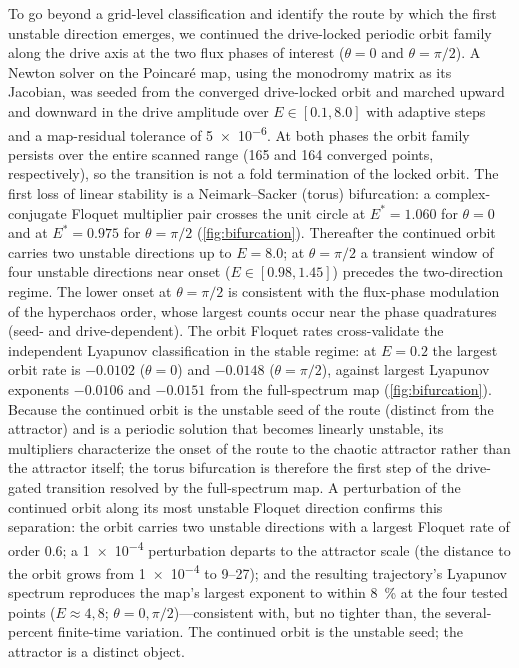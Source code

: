 \documentclass[preprint,numbers,a4paper]{elsarticle}
\begin{document}
To go beyond a grid-level classification and identify the route by which the first unstable direction emerges, we continued the drive-locked periodic orbit family along the drive axis at the two flux phases of interest ($\theta=0$ and $\theta=\pi/2$). A Newton solver on the Poincar\'e map, using the monodromy matrix as its Jacobian, was seeded from the converged drive-locked orbit and marched upward and downward in the drive amplitude over $E\in[\num{0.1},\num{8.0}]$ with adaptive steps and a map-residual tolerance of \num{5e-6}. At both phases the orbit family persists over the entire scanned range (\num{165} and \num{164} converged points, respectively), so the transition is not a fold termination of the locked orbit. The first loss of linear stability is a Neimark--Sacker (torus) bifurcation: a complex-conjugate Floquet multiplier pair crosses the unit circle at $E^{*}=\num{1.060}$ for $\theta=0$ and at $E^{*}=\num{0.975}$ for $\theta=\pi/2$ (\cref{fig:bifurcation}). Thereafter the continued orbit carries two unstable directions up to $E=\num{8.0}$; at $\theta=\pi/2$ a transient window of four unstable directions near onset ($E\in[\num{0.98},\num{1.45}]$) precedes the two-direction regime. The lower onset at $\theta=\pi/2$ is consistent with the flux-phase modulation of the hyperchaos order, whose largest counts occur near the phase quadratures (seed- and drive-dependent). The orbit Floquet rates cross-validate the independent Lyapunov classification in the stable regime: at $E=\num{0.2}$ the largest orbit rate is $-\num{0.0102}$ ($\theta=0$) and $-\num{0.0148}$ ($\theta=\pi/2$), against largest Lyapunov exponents $-\num{0.0106}$ and $-\num{0.0151}$ from the full-spectrum map (\cref{fig:bifurcation}). Because the continued orbit is the unstable seed of the route (distinct from the attractor) and is a periodic solution that becomes linearly unstable, its multipliers characterize the onset of the route to the chaotic attractor rather than the attractor itself; the torus bifurcation is therefore the first step of the drive-gated transition resolved by the full-spectrum map. A perturbation of the continued orbit along its most unstable Floquet direction confirms this separation: the orbit carries two unstable directions with a largest Floquet rate of order \num{0.6}; a \num{1e-4} perturbation departs to the attractor scale (the distance to the orbit grows from \num{1e-4} to \num{9}--\num{27}); and the resulting trajectory's Lyapunov spectrum reproduces the map's largest exponent to within \qty{8}{\percent} at the four tested points ($E\approx\num{4},\num{8}$; $\theta=0,\pi/2$)---consistent with, but no tighter than, the several-percent finite-time variation. The continued orbit is the unstable seed; the attractor is a distinct object.
\end{document}
